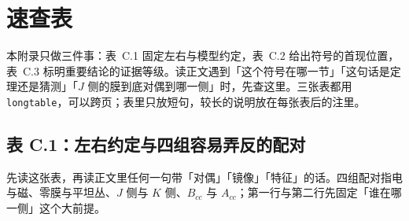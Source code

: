 \section{速查表}
\label{app:sym}

本附录只做三件事：表~C.1 固定左右与模型约定，表~C.2 给出符号的首现位置，表~C.3 标明重要结论的证据等级。读正文遇到「这个符号在哪一节」「这句话是定理还是猜测」「$J$ 侧的膜到底对偶到哪一侧」时，先查这里。三张表都用 \texttt{longtable}，可以跨页；表里只放短句，较长的说明放在每张表后的注里。

\subsection{表 C.1：左右约定与四组容易弄反的配对}

先读这张表，再读正文里任何一句带「对偶」「镜像」「特征」的话。四组配对指电与磁、零膜与平坦丛、$J$ 侧与 $K$ 侧、$B_{cc}$ 与 $A_{cc}$；第一行与第二行先固定「谁在哪一侧」这个大前提。

